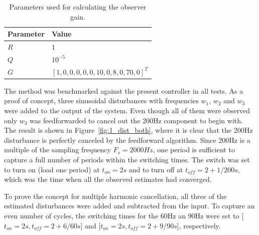 \begin{table}[h!]
  \centering
  \begin{tabular}{| l | l |}
    \hline
    Parameter & Value \\ \hline
    $R$ & $1$ \\
    $Q$ & $10^{-5}$ \\
    $G$ & $[1, 0, 0, 0, 0, 0, 10, 0, 8, 0, 70, 0]^T$ \\
    \hline
  \end{tabular}
  \caption{\label{tab:kalman} Parameters used for calculating the observer gain.}
\end{table}

The \abbrRFDC method was benchmarked against the present controller in all tests. As a proof of concept, three sinusoidal disturbances with frequencies $w_1$, $w_2$ and $w_3$ were added to the output of the system. Even though all of them were observed only $w_3$ was feedforwarded to cancel out the 200Hz component to begin with. The result is shown in Figure~\ref{fig:1_dist_both}, where it is clear that the 200Hz disturbance is perfectly canceled by the feedforward algorithm. Since 200Hz is a multiple of the sampling frequency $F_s = 2000Hz$, one period is sufficient to capture a full number of periods within the switching times. The switch was set to turn on (load one period) at $t_{on}=2s$ and to turn off at $t_{off}=2+1/200s$, which was the time when all the observed estimates had converged.

To prove the concept for multiple harmonic cancellation, all three of the estimated disturbances were added and subtracted from the input. To capture an even number of cycles, the switching times for the 60Hz an 90Hz were set to [$t_{on}=2s, t_{off}=2+6/60 s$] and [$t_{on}=2s, t_{off}=2+9/90 s$], respectively.

